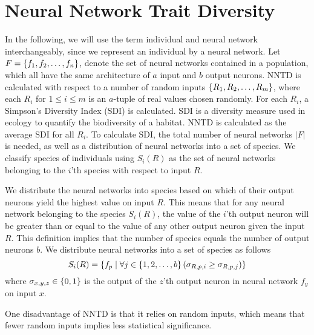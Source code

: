 \section{Neural Network Trait Diversity}
In the following, we will use the term individual and neural network interchangeably, since we represent an individual by a neural network.  Let $F = \{ f_1, f_2, \dots, f_n \}$, denote the set of neural networks contained in a population, which all have the same architecture of $a$ input and $b$ output neurons. NNTD is calculated with respect to a number of random inputs $\{ R_1, R_2, \dots, R_m \}$, where each $R_i$ for $1 \leq i \leq m$ is an $a$-tuple of real values chosen randomly. For each $R_i$, a Simpson's Diversity Index (SDI) is calculated. SDI is a diversity measure used in ecology to quantify the biodiversity of a habitat. NNTD is calculated as the average SDI for all $R_i$.
To calculate SDI, the total number of neural networks $\lvert F \lvert$ is needed, as well as a distribution of neural networks into a set of species. We classify species of individuals using $S_i(R)$ as the set of neural networks belonging to the $i$'th species with respect to input $R$.

We distribute the neural networks into species based on which of their output neurons yield the highest value on input $R$. This means that for any neural network belonging to the species $S_i(R)$, the value of the $i$'th output neuron will be greater than or equal to the value of any other output neuron given the input $R$.  This definition implies that the number of species equals the number of output neurons $b$. We distribute neural networks into a set of species as follows
%
\begin{equation*}\label{eq:species}
  S_i(R) = \{ f_p \mid \forall j \in \{ 1, 2, \dots, b \} \left(\sigma_{R,p,i} \geq \sigma_{R,p,j}\right) \}
\end{equation*}
%
where $\sigma_{x ,y, z} \in \{ 0, 1 \}$ is the output of the $z$'th output neuron in neural network $f_y$ on input $x$.

One disadvantage of NNTD is that it relies on random inputs, which means that fewer random inputs implies less statistical significance.

